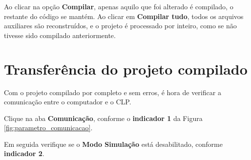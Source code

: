 \begin{figure}[ht!]
	\centering
\end{figure}


Ao clicar na opção \textbf{Compilar}, 
apenas aquilo que foi alterado é compilado, 
o restante do código se mantém. 
Ao clicar em \textbf{Compilar tudo}, 
todos os arquivos auxiliares são reconstruídos, 
e o projeto é processado por inteiro, 
como se não tivesse sido compilado anteriormente. 


\section{Transferência do projeto compilado}

Com o projeto compilado por completo e sem erros, 
é hora de verificar a comunicação entre o computador e o CLP. 

Clique na aba \textbf{Comunicação}, conforme o \textbf{indicador 1} da Figura \ref{fig:parametro_comunicacao}. 

Em seguida verifique se o \textbf{Modo Simulação} está desabilitado, conforme \textbf{indicador 2}. 



\begin{figure}[ht!]
	\centering
\end{figure}


